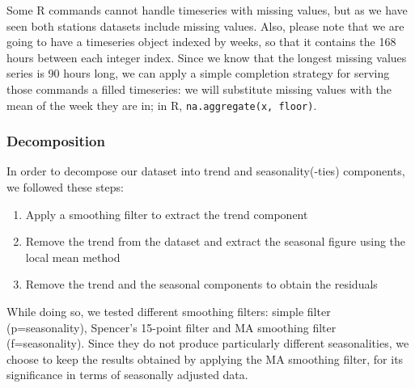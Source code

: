 \documentclass[12pt]{article}
\begin{document}
Some R commands cannot handle timeseries with missing values, but as we have seen both stations datasets include missing values.
Also, please note that we are going to have a timeseries object indexed by weeks, so that it contains the 168 hours between each integer index.
Since we know that the longest missing values series is 90 hours long, we can apply a simple completion strategy for serving those commands a filled timeseries: we will substitute missing values with the mean of the week they are in; in R, \texttt{na.aggregate(x, floor)}.


\subsubsection{Decomposition}
In order to decompose our dataset into trend and seasonality(-ties) components, we followed these steps:
\begin{enumerate}[topsep=0.5em,itemsep=0em,partopsep=0.5em]
	\item Apply a smoothing filter to extract the trend component
	\item Remove the trend from the dataset and extract the seasonal figure using the local mean method
	\item Remove the trend and the seasonal components to obtain the residuals
\end{enumerate}
While doing so, we tested different smoothing filters: simple filter (p=seasonality), Spencer's 15-point filter and MA smoothing filter (f=seasonality). Since they do not produce particularly different seasonalities, we choose to keep the results obtained by applying the MA smoothing filter, for its significance in terms of seasonally adjusted data.
\end{document}
